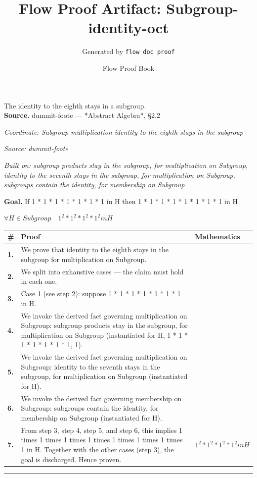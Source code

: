 \documentclass[11pt]{article}
\title{Flow Proof Artifact: Subgroup-identity-oct}
\author{Generated by \texttt{flow doc proof}}
\date{Flow Proof Book}
\theoremstyle{definition}
\begin{document}
\maketitle
The identity to the eighth stays in a subgroup.\\[0.5em]
\textbf{Source.} dummit-foote — *Abstract Algebra*, §2.2\\[0.5em]
\bigskip
{}\par
\smallskip\noindent\textit{Coordinate: Subgroup \cdot multiplication \cdot identity to the eighth stays in the subgroup}\par
\smallskip\noindent\textit{Source: dummit-foote}\par
\smallskip\noindent\textit{Built on: subgroup products stay in the subgroup, for multiplication on Subgroup, identity to the seventh stays in the subgroup, for multiplication on Subgroup, subgroups contain the identity, for membership on Subgroup}\par
\medskip
\noindent\textbf{Goal.} If 1 * 1 * 1 * 1 * 1 * 1 * 1 in H then 1 * 1 * 1 * 1 * 1 * 1 * 1 * 1 in H\par
\noindent$\displaystyle \forall H \in Subgroup\quad 1^{2} * 1^{2} * 1^{2} * 1^{2} in H$\par
\medskip
\noindent
\begin{tabular}{@{} >{\raggedright\arraybackslash}p{} >{\raggedright\arraybackslash}p{} >{\raggedleft\arraybackslash}p{} @{}}
\textbf{\#} & \textbf{Proof} & \textbf{Mathematics} \\
\midrule
\textbf{1.} & We prove that identity to the eighth stays in the subgroup for multiplication on Subgroup. & \\[0.45em]
\textbf{2.} & We split into exhaustive cases — the claim must hold in each one. & \\[0.45em]
\textbf{3.} & Case 1 (see step 2): suppose 1 * 1 * 1 * 1 * 1 * 1 * 1 in H. & \\[0.45em]
\textbf{4.} & We invoke the derived fact governing multiplication on Subgroup: subgroup products stay in the subgroup, for multiplication on Subgroup (instantiated for H, 1 * 1 * 1 * 1 * 1 * 1 * 1, 1). & \\[0.45em]
\textbf{5.} & We invoke the derived fact governing multiplication on Subgroup: identity to the seventh stays in the subgroup, for multiplication on Subgroup (instantiated for H). & \\[0.45em]
\textbf{6.} & We invoke the derived fact governing membership on Subgroup: subgroups contain the identity, for membership on Subgroup (instantiated for H). & \\[0.45em]
\textbf{7.} & From step 3, step 4, step 5, and step 6, this implies 1 times 1 times 1 times 1 times 1 times 1 times 1 times 1 in H. Together with the other cases (step 3), the goal is discharged. Hence proven. & $\displaystyle 1^{2} * 1^{2} * 1^{2} * 1^{2} in H$ \\[0.45em]
\bottomrule
\end{tabular}
\label{thm:Subgroup-multiplication-identity_to_the_eighth_stays_in_the_subgroup}
\par\medskip\hrule
\end{document}
